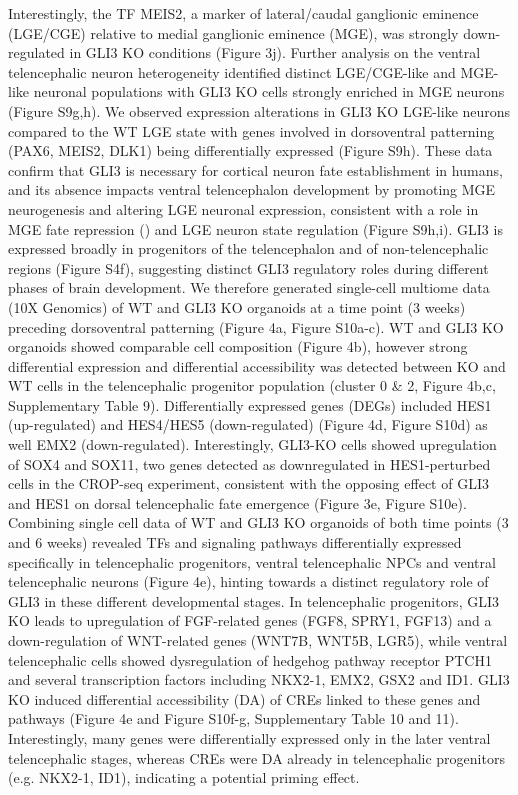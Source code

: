 Interestingly, the TF MEIS2, a marker of lateral/caudal ganglionic eminence (LGE/CGE) relative to medial ganglionic eminence (MGE), was strongly down-regulated in GLI3 KO conditions (Figure 3j). Further analysis on the ventral telencephalic neuron heterogeneity identified distinct LGE/CGE-like and MGE-like neuronal populations with GLI3 KO cells strongly enriched in MGE neurons (Figure S9g,h). We observed expression alterations in GLI3 KO LGE-like neurons compared to the WT LGE state with genes involved in dorsoventral patterning (PAX6, MEIS2, DLK1) being differentially expressed (Figure S9h). These data confirm that GLI3 is necessary for cortical neuron fate establishment in humans, and its absence impacts ventral telencephalon development by promoting MGE neurogenesis and altering LGE neuronal expression, consistent with a role in MGE fate repression (\cite{sousa_sonic_2010}) and LGE neuron state regulation (Figure S9h,i).
GLI3 is expressed broadly in progenitors of the telencephalon and of non-telencephalic regions (Figure S4f), suggesting distinct GLI3 regulatory roles during different phases of brain development. We therefore generated single-cell multiome data (10X Genomics) of WT and GLI3 KO organoids at a time point (3 weeks) preceding dorsoventral patterning (Figure 4a, Figure S10a-c). WT and GLI3 KO organoids showed comparable cell composition (Figure 4b), however strong differential expression and differential accessibility was detected between KO and WT cells in the telencephalic progenitor population (cluster 0 \& 2, Figure 4b,c, Supplementary Table 9). Differentially expressed genes (DEGs) included HES1 (up-regulated) and HES4/HES5 (down-regulated) (Figure 4d, Figure S10d) as well EMX2 (down-regulated). Interestingly, GLI3-KO cells showed upregulation of SOX4 and SOX11, two genes detected as downregulated in HES1-perturbed cells in the CROP-seq experiment, consistent with the opposing effect of GLI3 and HES1 on dorsal telencephalic fate emergence (Figure 3e, Figure S10e).
Combining single cell data of WT and GLI3 KO organoids of both time points (3 and 6 weeks) revealed TFs and signaling pathways differentially expressed specifically in telencephalic progenitors, ventral telencephalic NPCs and ventral telencephalic neurons (Figure 4e), hinting towards a distinct regulatory role of GLI3 in these different developmental stages. In telencephalic progenitors, GLI3 KO leads to upregulation of FGF-related genes (FGF8, SPRY1, FGF13) and a down-regulation of WNT-related genes (WNT7B, WNT5B, LGR5), while ventral telencephalic cells showed dysregulation of hedgehog pathway receptor PTCH1 and several transcription factors including NKX2-1, EMX2, GSX2 and ID1. GLI3 KO induced differential accessibility (DA) of CREs linked to these genes and pathways (Figure 4e and Figure S10f-g, Supplementary Table 10 and 11). Interestingly, many genes were differentially expressed only in the later ventral telencephalic stages, whereas CREs were DA already in telencephalic progenitors (e.g. NKX2-1, ID1), indicating a potential priming effect.

